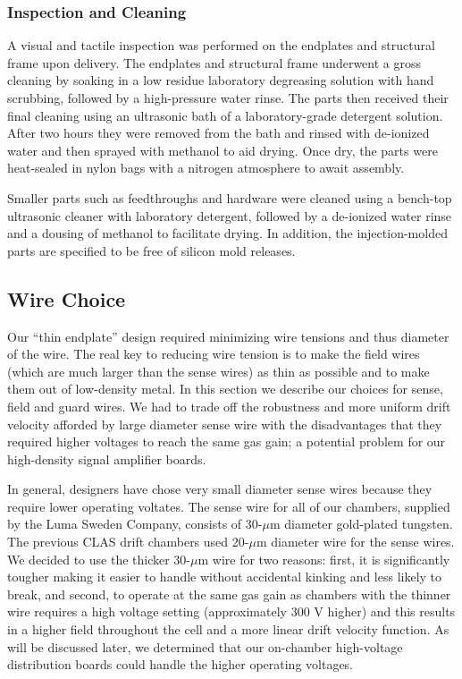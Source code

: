 \subsubsection{Inspection and Cleaning}

A visual and tactile inspection was performed on the endplates and 
structural frame upon delivery.  The endplates and structural 
frame underwent a gross cleaning by soaking in a low residue laboratory 
degreasing solution with hand scrubbing, followed by a high-pressure water 
rinse. The parts then received their final cleaning using an ultrasonic 
bath of a laboratory-grade detergent solution.  After two hours they were
removed from the bath and rinsed with de-ionized water and then sprayed 
with methanol to aid drying. Once dry, the parts were heat-sealed in nylon 
bags with a nitrogen atmosphere to await assembly.

Smaller parts such as feedthroughs and hardware were cleaned using a 
bench-top ultrasonic cleaner with laboratory detergent, followed by a 
de-ionized water rinse and a dousing of methanol to facilitate drying.  
In addition, the injection-molded parts are specified to be free of silicon 
mold releases.



\subsection{Wire Choice}
\hskip 0.15in

Our ``thin endplate'' design required minimizing wire tensions and
thus diameter of the wire.  The real key to reducing wire tension is to
make the field wires (which are much larger than the sense wires) as 
thin as possible and to make them out of low-density metal.  In this 
section we describe our choices for sense, field and guard wires.
We had to trade off the robustness and more uniform drift velocity
afforded by large diameter sense wire with the disadvantages that they
required higher voltages to reach the same gas gain; 
a potential problem for our high-density signal amplifier boards.

In general, designers have chose very small diameter sense wires because they
require lower operating voltates.
The sense wire for all of our chambers, supplied by the Luma
Sweden Company, consists of 30-$\mu$m diameter gold-plated tungsten.  
The previous CLAS drift chambers used 20-$\mu$m diameter wire for the
sense wires.  We decided to use the thicker 30-$\mu$m wire for two 
reasons: first, it is significantly tougher making it easier to handle without
accidental kinking and less likely to break, and second, to operate at the same 
gas gain as chambers with the thinner wire requires a high voltage setting 
(approximately 300 V higher) and this results in a higher field throughout the cell
and a more linear drift velocity function.  As will be discussed later,
we determined that our on-chamber high-voltage distribution boards could
handle the higher operating voltages.

